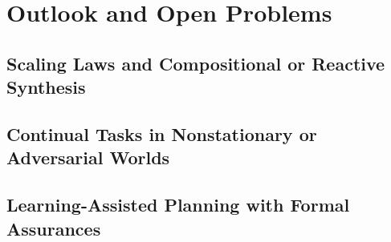 \chapter{Outlook and Open Problems}
\label{chap:outlook}


\section{Scaling Laws and Compositional or Reactive Synthesis}

\section{Continual Tasks in Nonstationary or Adversarial Worlds}

\section{Learning-Assisted Planning with Formal Assurances}
